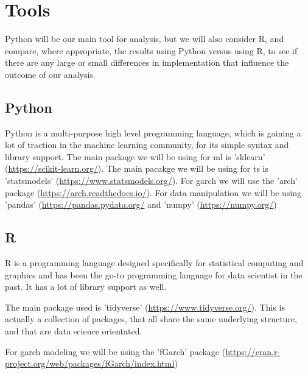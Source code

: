 \chapter{Tools}
Python will be our main tool for analysis, but we will also consider R, and compare, where appropriate, the results using Python versus using R, to see if there are any large or small differences in implementation that influence the outcome of our analysis.

\section{Python}
Python is a multi-purpose high level programming language, which is gaining a lot of traction in the machine learning community, for its simple syntax and library support.
The main package we will be using for \acrlong{ml} is 'sklearn' (\url{https://scikit-learn.org/}).
The main pacakge we will be using for \acrlong{ts} is 'statsmodels' (\url{https://www.statsmodels.org/}).
For \acrshort{garch} we will use the 'arch' package (\url{https://arch.readthedocs.io/}).
For data manipulation we will be using 'pandas' (\url{https://pandas.pydata.org/} and 'numpy' (\url{https://numpy.org/})

\section{R}
R is a programming language designed specifically for statistical computing and graphics and has been the go-to programming language for data scientist in the past. It has a lot of library support as well.


The main package used is 'tidyverse' (\url{https://www.tidyverse.org/}). This is actually a collection of packages, that all share the same underlying structure, and that are data science orientated.


For \acrshort{garch} modeling we will be using the 'fGarch' package (\url{https://cran.r-project.org/web/packages/fGarch/index.html})